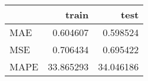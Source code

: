 \begin{tabular}{lrr}
\toprule
{} &      train &       test \\
\midrule
MAE  &   0.604607 &   0.598524 \\
MSE  &   0.706434 &   0.695422 \\
MAPE &  33.865293 &  34.046186 \\
\bottomrule
\end{tabular}
